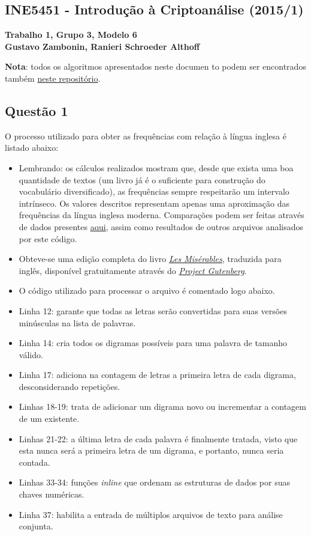 \documentclass{article}
\begin{document}
\begin{center}
    \section*{INE5451 - Introdução à Criptoanálise (2015/1)}
    \textbf{Trabalho 1, Grupo 3, Modelo 6 \\
    Gustavo Zambonin, Ranieri Schroeder Althoff}
\end{center}

\textbf{Nota}: todos os algoritmos apresentados neste documen   to podem ser encontrados também \href{https://github.com/zambonin/ufsc-ine5451}{neste repositório}.

\subsection*{Questão 1}
O processo utilizado para obter as frequências com relação à língua inglesa é listado abaixo:
\begin{itemize}
    \item Lembrando: os cálculos realizados mostram que, desde que exista uma boa quantidade de textos (um livro já é o suficiente para construção do vocabulário diversificado), as frequências sempre respeitarão um intervalo intrínseco. Os valores descritos representam apenas uma aproximação das frequências da língua inglesa moderna. Comparações podem ser feitas através de dados presentes \href{http://en.wikipedia.org/wiki/Letter_frequency#Relative_frequencies_of_letters_in_the_English_language}{aqui}, assim como resultados de outros arquivos analisados por este código.
    \item Obteve-se uma edição completa do livro \textit{\href{http://www.gutenberg.org/cache/epub/135/pg135.txt}{Les Misérables}}, traduzida para inglês, disponível gratuitamente através do \textit{\href{http://www.gutenberg.org}{Project Gutenberg}}.
    \item O código utilizado para processar o arquivo é comentado logo abaixo.
    
    \item Linha 12: garante que todas as letras serão convertidas para suas versões minúsculas na lista de palavras.
    \item Linha 14: cria todos os digramas possíveis para uma palavra de tamanho válido.
    \item Linha 17: adiciona na contagem de letras a primeira letra de cada digrama, desconsiderando repetições.
    \item Linhas 18-19: trata de adicionar um digrama novo ou incrementar a contagem de um existente.
    \item Linhas 21-22: a última letra de cada palavra é finalmente tratada, visto que esta nunca será a primeira letra de um digrama, e portanto, nunca seria contada.
    \item Linhas 33-34: funções \textit{inline} que ordenam as estruturas de dados por suas chaves numéricas.
    \item Linha 37: habilita a entrada de múltiplos arquivos de texto para análise conjunta.
\end{itemize}
\end{document}
